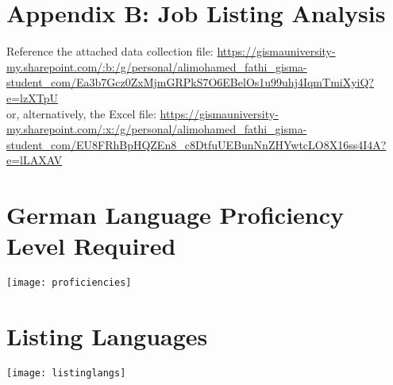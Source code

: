 \section{Appendix B: Job Listing Analysis}
\label{appendix:B}
\vspace*{1em}
Reference the attached data collection file: \url{https://gismauniversity-my.sharepoint.com/:b:/g/personal/alimohamed\_fathi\_gisma-student\_com/Ea3b7Gcz0ZxMjmGRPkS7O6EBelOs1u99uhj4IqmTmiXyiQ?e=lzXTpU} \\

or, alternatively, the Excel file: \url{https://gismauniversity-my.sharepoint.com/:x:/g/personal/alimohamed\_fathi\_gisma-student\_com/EU8FRhBpHQZEn8\_c8DtfuUEBunNnZHYwtcLO8X16ss4I4A?e=lLAXAV}

\graphicspath{ {./attachments/appB} }
\noindent
\section*{German Language Proficiency Level Required} \vspace{1em}

\texttt{[image: proficiencies]}

\section*{Listing Languages} \vspace{1em}

\texttt{[image: listinglangs]}

\clearpage